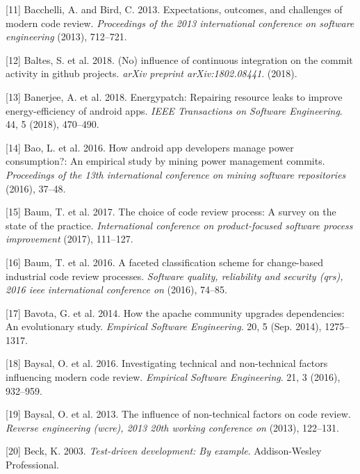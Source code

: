 \documentclass[]{book}
\begin{document}
\hypertarget{ref-bacchelli2013expectations}{}
{[}11{]} Bacchelli, A. and Bird, C. 2013. Expectations, outcomes, and
challenges of modern code review. \emph{Proceedings of the 2013
international conference on software engineering} (2013), 712--721.

\hypertarget{ref-baltes2018no}{}
{[}12{]} Baltes, S. et al. 2018. (No) influence of continuous
integration on the commit activity in github projects. \emph{arXiv
preprint arXiv:1802.08441}. (2018).

\hypertarget{ref-BCBR2017}{}
{[}13{]} Banerjee, A. et al. 2018. Energypatch: Repairing resource leaks
to improve energy-efficiency of android apps. \emph{IEEE Transactions on
Software Engineering}. 44, 5 (2018), 470--490.

\hypertarget{ref-BLXWT2016}{}
{[}14{]} Bao, L. et al. 2016. How android app developers manage power
consumption?: An empirical study by mining power management commits.
\emph{Proceedings of the 13th international conference on mining
software repositories} (2016), 37--48.

\hypertarget{ref-baum2017choice}{}
{[}15{]} Baum, T. et al. 2017. The choice of code review process: A
survey on the state of the practice. \emph{International conference on
product-focused software process improvement} (2017), 111--127.

\hypertarget{ref-baum2016faceted}{}
{[}16{]} Baum, T. et al. 2016. A faceted classification scheme for
change-based industrial code review processes. \emph{Software quality,
reliability and security (qrs), 2016 ieee international conference on}
(2016), 74--85.

\hypertarget{ref-Bavota2014}{}
{[}17{]} Bavota, G. et al. 2014. How the apache community upgrades
dependencies: An evolutionary study. \emph{Empirical Software
Engineering}. 20, 5 (Sep. 2014), 1275--1317.

\hypertarget{ref-baysal2016investigating}{}
{[}18{]} Baysal, O. et al. 2016. Investigating technical and
non-technical factors influencing modern code review. \emph{Empirical
Software Engineering}. 21, 3 (2016), 932--959.

\hypertarget{ref-baysal2013influence}{}
{[}19{]} Baysal, O. et al. 2013. The influence of non-technical factors
on code review. \emph{Reverse engineering (wcre), 2013 20th working
conference on} (2013), 122--131.

\hypertarget{ref-beck2003test}{}
{[}20{]} Beck, K. 2003. \emph{Test-driven development: By example}.
Addison-Wesley Professional.
\end{document}
